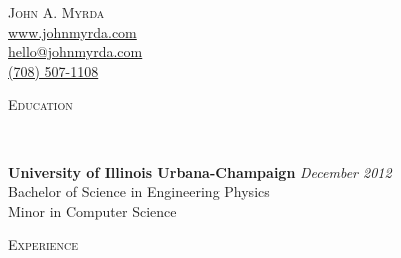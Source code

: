 \documentclass{article}
\newenvironment{changemargin}[2]{%
  \begin{list}{}{%
    \setlength{\topsep}{0pt}%
    \setlength{\leftmargin}{#1}%
    \setlength{\rightmargin}{#2}%
    \setlength{\listparindent}{\parindent}%
    \setlength{\itemindent}{\parindent}%
    \setlength{\parsep}{\parskip}%
  }%
  \item[]}{\end{list}
}
\newcommand{\lineover}{
	\begin{changemargin}{-0.05in}{-0.05in}
		\vspace*{-8pt}
		\hrulefill \\
		\vspace*{-2pt}
	\end{changemargin}
}
\newcommand{\header}[1]{
	\begin{changemargin}{-0.5in}{-0.5in}
		\scshape{#1}\\
  	\lineover
	\end{changemargin}
}
\newcommand{\contact}[4]{
	\begin{changemargin}{-0.5in}{-0.5in}
		\begin{center}
			{\Large \scshape {#1}}\\ \smallskip
			{#2}\\ \smallskip 
			{#3}\\ \smallskip
			{#4}\smallskip
		\end{center}
	\end{changemargin}
}
\newenvironment{body} {
	\vspace*{-16pt}
	\begin{changemargin}{-0.25in}{-0.5in}
  }	
	{\end{changemargin}
}
\begin{document}
\contact{John A. Myrda}{\href{http://www.johnmyrda.com}{www.johnmyrda.com}}{\href{mailto:hello@johnmyrda.com}{hello@johnmyrda.com}}{\href{tel:7085071108}{(708) 507-1108}}




\header{Education}

\begin{body}
	\vspace{14pt}
	\textbf{University of Illinois Urbana-Champaign} \hfill \emph{December 2012}{} \\
	\hspace{4ex} Bachelor of Science in Engineering Physics \\
	\hspace{4ex} Minor in Computer Science\\
\end{body}


\header{Experience}
\end{document}
